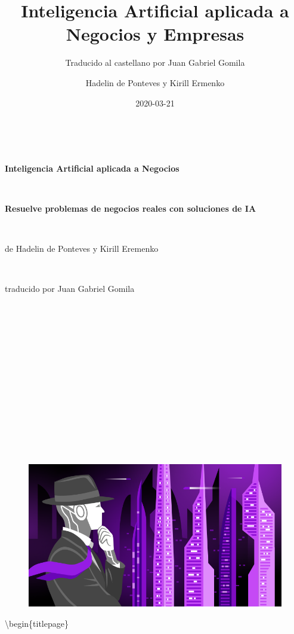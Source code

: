 \documentclass[]{book}
\title{Inteligencia Artificial aplicada a Negocios y Empresas}
\subtitle{Traducido al castellano por Juan Gabriel Gomila}
\author{Hadelin de Ponteves y Kirill Ermenko}
\date{2020-03-21}
\begin{document}
\maketitle


\begin{titlepage}

\begin{center}

\

\Huge \textbf{Inteligencia Artificial aplicada a Negocios}

\

\Large \textbf{Resuelve problemas de negocios reales con soluciones de IA}

\

\large de Hadelin de Ponteves y Kirill Eremenko

\

\large traducido por Juan Gabriel Gomila


\end{center}

\

\

\

\

\

\

\

\

\begin{figure}[!htbp]
		\begin{center}
			\includegraphics[scale=0.6]{Course_Image.png}
		\end{center}
\end{figure}

\end{titlepage}

{
\setcounter{tocdepth}{1}
\tableofcontents
}
\textbackslash{}begin\{titlepage\}
\end{document}
